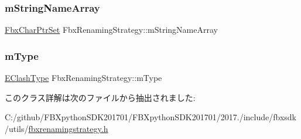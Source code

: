 \mbox{\label{class_fbx_renaming_strategy_aca7cf36d91294a0fe5bce55803c89e7e}} 
\subsubsection{\texorpdfstring{m\+String\+Name\+Array}{mStringNameArray}}
{\footnotesize\ttfamily \hyperlink{class_fbx_char_ptr_set}{Fbx\+Char\+Ptr\+Set} Fbx\+Renaming\+Strategy\+::m\+String\+Name\+Array\hspace{0.3cm}{\ttfamily [protected]}}

\mbox{\label{class_fbx_renaming_strategy_a9871e311bddf13b0263f71e646f5b06d}} 
\subsubsection{\texorpdfstring{m\+Type}{mType}}
{\footnotesize\ttfamily \hyperlink{class_fbx_renaming_strategy_aacebe214cec13a6cdbbc9e40d16c57dd}{E\+Clash\+Type} Fbx\+Renaming\+Strategy\+::m\+Type\hspace{0.3cm}{\ttfamily [protected]}}



このクラス詳解は次のファイルから抽出されました\+:\begin{DoxyCompactItemize}
\item 
C\+:/github/\+F\+B\+Xpython\+S\+D\+K201701/\+F\+B\+Xpython\+S\+D\+K201701/2017./include/fbxsdk/utils/\hyperlink{fbxrenamingstrategy_8h}{fbxrenamingstrategy.\+h}\end{DoxyCompactItemize}
